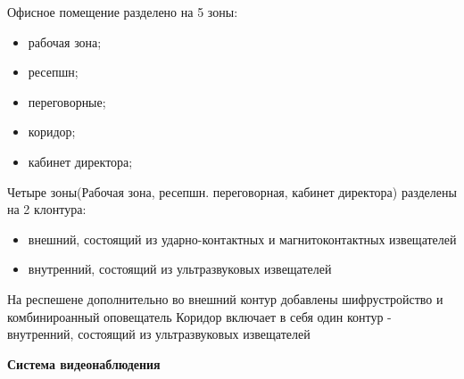 \documentclass[a4paper,14pt]{extarticle}
\begin{document}
    \begin{spacing}{1.25}
        Офисное помещение разделено на 5 зоны:
        \vspace{-1ex}
        \begin{spacing}{0.5}
            \begin{itemize}
                \item рабочая зона;
                \item ресепшн;
                \item переговорные; 
                \item коридор;
                \item кабинет директора;
            \end{itemize}
        \end{spacing}
        Четыре зоны(Рабочая зона, ресепшн. переговорная, кабинет директора) разделены на 2 клонтура:
        \begin{spacing}{0.5}
            \begin{itemize}
                \item внешний, состоящий из ударно-контактных и магнитоконтактных извещателей
                \item внутренний, состоящий из ультразвуковых извещателей 
            \end{itemize}
        \end{spacing}
        На респешене дополнительно во внешний контур добавлены шифрустройство и комбинироанный оповещатель
        Коридор включает в себя один контур - внутренний, состоящий из ультразвуковых извещателей
    \end{spacing}
    
    \vspace{3ex}
    \textbf{\large{Система видеонаблюдения}}
\end{document}
